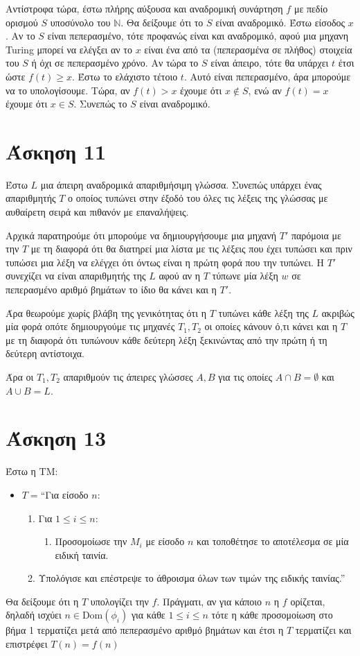 \documentclass[a4paper, oneside, 11pt]{article}
\theoremstyle{definition}
\begin{document}
Αντίστροφα τώρα, έστω πλήρης αύξουσα και αναδρομική συνάρτηση $f$ με πεδίο ορισμού $S$
υποσύνολο του $\mathbb{N}$. Θα δείξουμε ότι το $S$ είναι αναδρομικό.
Έστω είσοδος $x$. 
Αν το $S$ είναι πεπερασμένο, τότε προφανώς είναι και αναδρομικό, αφού μια μηχανη Turing
μπορεί να ελέγξει αν το $x$ είναι ένα από τα (πεπερασμένα σε πλήθος) στοιχεία του $S$
ή όχι σε πεπερασμένο χρόνο. Αν τώρα το $S$ είναι άπειρο, τότε θα υπάρχει $t$ έτσι
ώστε $f(t) \geq x$. Έστω το ελάχιστο τέτοιο $t$. Αυτό είναι πεπερασμένο, άρα μπορούμε
να το υπολογίσουμε. Τώρα, αν $f(t) > x$ έχουμε ότι $x\notin S$, ενώ αν $f(t) = x$
έχουμε ότι $x\in S$. Συνεπώς το $S$ είναι αναδρομικό.

\section*{Άσκηση 11}

Έστω $L$ μια άπειρη αναδρομικά απαριθμήσιμη γλώσσα. Συνεπώς υπάρχει ένας απαριθμητής
$T$ ο οποίος τυπώνει στην έξοδό του όλες τις λέξεις της γλώσσας με αυθαίρετη σειρά
και πιθανόν με επαναλήψεις.

Αρχικά παρατηρούμε ότι μπορούμε να δημιουργήσουμε μια μηχανή $T'$ παρόμοια με την $T$
με τη διαφορά ότι θα διατηρεί μια λίστα με τις λέξεις που έχει τυπώσει και πριν
τυπώσει μια λέξη να ελέγχει ότι όντως είναι η πρώτη φορά που την τυπώνει. H $T'$
συνεχίζει να είναι απαριθμητής της $L$ αφού αν η $T$ τύπωνε μία λέξη $w$ σε
πεπερασμένο αριθμό βημάτων το ίδιο θα κάνει και η $T'$.

Άρα θεωρούμε χωρίς βλάβη της γενικότητας ότι η $T$ τυπώνει κάθε λέξη της $L$ ακριβώς
μία φορά οπότε δημιουργούμε τις μηχανές $T_1, T_2$ οι οποίες κάνουν ό,τι κάνει και η
$T$ με τη διαφορά ότι τυπώνουν κάθε δεύτερη λέξη ξεκινώντας από την πρώτη ή τη
δεύτερη αντίστοιχα.

Άρα οι $T_1, T_2$ απαριθμούν τις άπειρες γλώσσες $A, B$ για τις οποίες $A \cap B =
\emptyset$ και $A \cup B = L$.

\section*{Άσκηση 13}

Έστω η ΤΜ:

\begin{itemize}
\item $T = $``Για είσοδο $n$:
      \begin{enumerate}
      \item Για $1 \leq i \leq n$:
            \begin{enumerate}
            \item Προσομοίωσε την $M_i$ με είσοδο $n$ και τοποθέτησε το αποτέλεσμα σε
                  μία ειδική ταινία.
            \end{enumerate}
      \item Υπολόγισε και επέστρεψε το άθροισμα όλων των τιμών της ειδικής ταινίας.''
      \end{enumerate}
\end{itemize}

Θα δείξουμε ότι η $T$ υπολογίζει την $f$. Πράγματι, αν για κάποιο $n$ η $f$ ορίζεται,
δηλαδή ισχύει
$n \in \text{Dom}(\phi_i)$ για κάθε $1 \leq i \leq n$ τότε η 
κάθε προσομοίωση στο βήμα 1 τερματίζει μετά από πεπερασμένο αριθμό βημάτων και έτσι η
$T$ τερματίζει και επιστρέφει $T(n) = f(n)$
\end{document}

